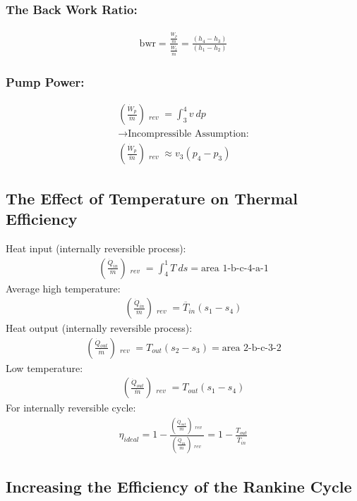 \subsubsection{The Back Work Ratio:}
\begin{gather}
  \text{bwr} = \frac{\frac{\dot{W}_p}{\dot{m}}}{\frac{\dot{W}_t}{\dot{m}}} = \frac{(h_4-h_3)}{(h_1-h_2)}
\end{gather}
\subsubsection{Pump Power:}
\begin{gather}
  \left(\frac{\dot{W}_p}{\dot{m}}\right)\mathop{_{int}}_{rev} = \int_{3}^{4}v \ dp \\[5pt]
  \longrightarrow \text{Incompressible Assumption:} \\[5pt]
  \left(\frac{\dot{W}_p}{\dot{m}}\right)\mathop{_{int}}_{rev} \approx v_3(p_4-p_3)
\end{gather}
\subsection{The Effect of Temperature on Thermal Efficiency}
Heat input (internally reversible process):
\begin{gather}
  \left(\frac{\dot{Q}_{in}}{\dot{m}}\right)\mathop{_{int}}_{rev} = \int_{4}^{1}T \ ds = \text{area 1-b-c-4-a-1}
\end{gather}
Average high temperature:
\begin{gather}
  \left(\frac{\dot{Q}_{in}}{\dot{m}}\right)\mathop{_{int}}_{rev} = \overline{T}_{in}(s_1-s_4)
\end{gather}
Heat output (internally reversible process):
\begin{gather}
  \left(\frac{\dot{Q}_{out}}{\dot{m}}\right)\mathop{_{int}}_{rev} = T_{out}(s_2-s_3) = \text{area 2-b-c-3-2}
\end{gather}
Low temperature:
\begin{gather}
  \left(\frac{\dot{Q}_{out}}{\dot{m}}\right)\mathop{_{int}}_{rev} = T_{out}(s_1-s_4)
\end{gather}
For internally reversible cycle:
\begin{gather}
  \eta_{ideal} = 1-\frac{\left(\frac{\dot{Q}_{out}}{\dot{m}}\right)\mathop{_{int}}_{rev}}{\left(\frac{\dot{Q}_{in}}{\dot{m}}\right)\mathop{_{int}}_{rev}} = 1-\frac{T_{out}}{\overline{T}_{in}}
\end{gather}
\subsection{Increasing the Efficiency of the Rankine Cycle}
